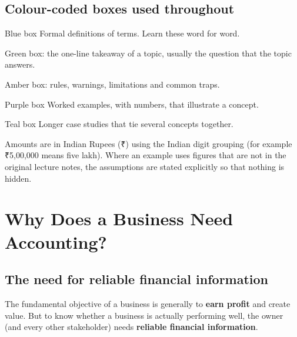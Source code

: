 \documentclass[11pt,a4paper]{article}
\newcommand{\Rs}{{\rsfont ₹}}
\begin{document}
\subsection*{Colour-coded boxes used throughout}
\begingroup\small{}
\begin{defbox}{Blue box}
Formal definitions of terms. Learn these word for word.
\end{defbox}
\begin{keybox}
Green box: the one-line takeaway of a topic, usually the question that the topic answers.
\end{keybox}
\begin{impbox}
Amber box: rules, warnings, limitations and common traps.
\end{impbox}
\begin{exbox}{Purple box}
Worked examples, with numbers, that illustrate a concept.
\end{exbox}
\begin{casebox}{Teal box}
Longer case studies that tie several concepts together.
\end{casebox}

\begin{notebox}[Conventions]
Amounts are in Indian Rupees (\Rs) using the Indian digit grouping (for example \Rs 5,00,000 means
five lakh). Where an example uses figures that are not in the original lecture notes, the
assumptions are stated explicitly so that nothing is hidden.
\end{notebox}
\endgroup

\clearpage
\tableofcontents
\clearpage

\section{Why Does a Business Need Accounting?}

\subsection{The need for reliable financial information}

The fundamental objective of a business is generally to \textbf{earn profit} and create value.
But to know whether a business is actually performing well, the owner (and every other stakeholder)
needs \textbf{reliable financial information}.
\end{document}
